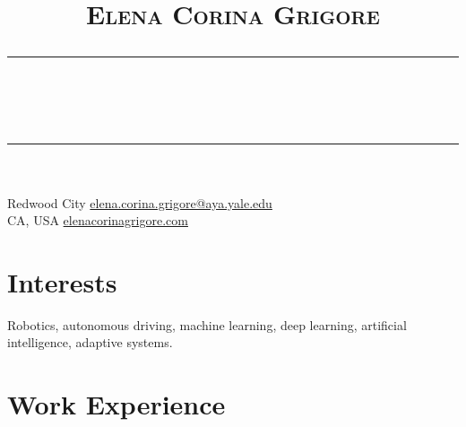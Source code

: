 \documentclass[10pt,letterpaper]{article}
\title{\vspace{-5em}
	\Huge{\textsc{Elena Corina Grigore}}
	\vspace{-0.7em}
	\\\noindent\rule{\linewidth}{0.5pt}
	\vspace{-2.5em}
	\\\noindent\rule{\linewidth}{0.5pt}
	\vspace{-3.2em}
}
\date{}
\begin{document}
\maketitle
\thispagestyle{fancy}



Redwood City \hfill \href{mailto:elena.corina.grigore@aya.yale.edu}{elena.corina.grigore@aya.yale.edu}\\
CA, USA \hfill \href{http://elenacorinagrigore.com}{elenacorinagrigore.com}

\vspace{-0.6em}
\section{Interests}
\vspace{-0.5em}
Robotics, autonomous driving, machine learning, deep learning, artificial intelligence, adaptive systems.

\vspace{-0.5em}
\section{Work Experience}
\end{document}
